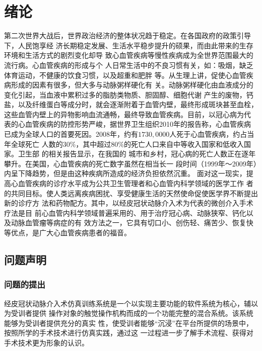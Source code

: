 \chapter{绪\;\;\;论}
\label{chap1}

第二次世界大战后，世界政治经济的整体状况趋于稳定。在各国政府的政策引导下，人民饱享经
济长期稳定发展、生活水平稳步提升的硕果，而由此带来的生存环境和生活方式的剧烈变化却导
致心血管疾病等慢性疾病成为全世界范围最大的流行病\cite{Hu2009}。心血管疾病的形成与个
人日常生活中的不良习惯有关，如：吸烟，缺乏体育运动，不健康的饮食习惯，以及超重和肥胖
等\cite{Go2013}。从生理上讲，促使心血管疾病形成的因素有很多，但大多与动脉粥样硬化有
关。动脉粥样硬化由血液成分的变化引起，当血液中累积过多的脂肪类物质、胆固醇、细胞代谢
产生的废物，钙盐，以及纤维蛋白等成分时，就会逐渐附着于血管内壁，最终形成斑块甚至血栓，
这些血管内壁上的异物影响血流通畅，最终导致血管疾病\cite{cvdaha}。目前，以冠心病为代
表的心血管疾病的防控形势严峻，据世界卫生组织2010年的报告\cite{mho2011}称，心血管疾病
已成为全球人口的首要死因。2008年，约有$1730,0000$人死于心血管疾病，约占当年全球死亡
人数的30\%，其中超过80\%的死亡人口来自中等收入国家和低收入国家\cite{mho2011}。卫生部
的相关报告\cite{moh2010annual}\cite{moh2007annual}\cite{moh2004annual}显示，在我国的
城市和乡村，冠心病的死亡人数正在逐年攀升。在美国，心血管疾病的死亡数字虽然在相当长一
段时间（1999年～2009年）内呈下降趋势，但是由这种疾病所造成的经济负担依然沉重\cite{Go2013}。
面对这一现实，提高心血管疾病的诊疗水平成为公共卫生管理者和心血管内科学领域的医学工作
者的共同目标。使人类远离疾病困扰、享受健康生活的天然使命促使医学界不断提出新的诊疗方
法和药物配方。其中，以经皮冠状动脉介入术\cite{Baim2005}为代表的微创介入手术疗法是目
前心血管内科学领域普遍采用的、用于治疗冠心病、动脉狭窄、钙化以及动脉血管瘤等病症的有
效方法之一，它具有切口小、创伤轻、痛苦少、恢复快等优点，是广大心血管疾病患者的福音。

\section{问题声明}
\label{sec1-1}

\subsection{问题的提出}
\label{subsec1-1-1}

经皮冠状动脉介入术仿真训练系统是一个以实现主要功能的软件系统为核心，辅以为受训者提供
操作对象的触觉操作机构而成的一个功能完整的混合系统。该系统能够为受训者提供充分的真实
性，使受训者能够“沉浸”在平台所提供的场景中，按照所学的手术技术进行仿真实践，通过这
一过程进一步了解手术流程、获得对手术技术更为形象的认识。

